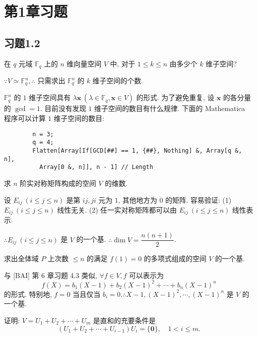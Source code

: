 \documentclass[color=black,device=normal,lang=cn,mode=geye]{elegantnote}
\begin{document}
\section{第1章习题}
\subsection{习题1.2}
\addtocounter{exsection}{2}
\begin{exercise}%
    在 $q$ 元域 $\mathbb{F}_q$ 上的 $n$ 维向量空间 $V$ 中, 对于 $1\leq k\leq n$ 由多少个 $k$ 维子空间?
\end{exercise}
\begin{solution}
    $\because V\simeq\mathbb{F}_q^n,\therefore$ 只需求出 $\mathbb{F}_q^n$ 的 $k$ 维子空间的个数.

    $\mathbb{F}_q^n$ 的 $1$ 维子空间具有 $\lambda\boldsymbol{x}\ (\lambda\in\mathbb{F}_q,\boldsymbol{x}\in V)$ 的形式. 为了避免重复, 设 $\boldsymbol{x}$ 的各分量的 $\gcd=1$. 目前没有发现 $1$ 维子空间的数目有什么规律. 下面的 Mathematica 程序可以计算 $1$ 维子空间的数目:
    \begin{verbatim}
        n = 3;
        q = 4;
        Flatten[Array[If[GCD[##] == 1, {##}, Nothing] &, Array[q &, n], 
          Array[0 &, n]], n - 1] // Length
    \end{verbatim}
\end{solution}
\begin{exercise}[1]\label{ex2.2}
    求 $n$ 阶实对称矩阵构成的空间 $V$ 的维数.
\end{exercise}
\begin{solution}
    设 $E_{ij}\ (i\leq j\leq n)$ 是第 $ij,ji$ 元为 $1$, 其他地方为 $0$ 的矩阵. 容易验证: (1) $E_{ij}\ (i\leq j\leq n)$ 线性无关. (2) 任一实对称矩阵都可以由 $E_{ij}\ (i\leq j\leq n)$ 线性表示.
    
    $\therefore E_{ij}\ (i\leq j\leq n)$ 是 $V$ 的一个基. $\therefore\dim V=\dfrac{n(n+1)}{2}$.
\end{solution}
\begin{exercise}%
    求出全体域 $P$ 上次数 $\leq n$ 的满足 $f(1)=0$ 的多项式组成的空间 $V$ 的一个基.
\end{exercise}
\begin{solution}
    与 [BAI] 第 6 章习题 4.3 类似, $\forall f\in V,f$ 可以表示为
    \[f(X)=b_1(X-1)+b_2(X-1)^2+\cdots+b_n(X-1)^n\]
    的形式. 特别地, $f=0$ 当且仅当 $b_i=0.\therefore X-1,(X-1)^2,\cdots,(X-1)^n$ 是 $V$ 的一个基.
\end{solution}
\begin{exercise}%
    证明: $V=U_1+U_2+\cdots+U_m$ 是直和的充要条件是
    \[(U_1+U_2+\cdots+U_{i-1})U_i=\{\boldsymbol{0}\},\quad 1<i\leq m.\]
\end{exercise}
\end{document}
